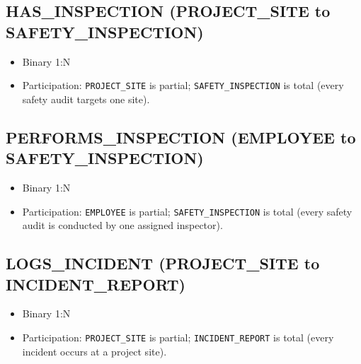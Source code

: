\documentclass[a4paper,12pt]{report}
\providecommand{\tightlist}{%
  \setlength{\itemsep}{0pt}\setlength{\parskip}{0pt}}
\begin{document}
\subsection{\texorpdfstring{HAS\texorpdfstring{\_\allowbreak{}}{_}INSPECTION (PROJECT\texorpdfstring{\_\allowbreak{}}{_}SITE to SAFETY\texorpdfstring{\_\allowbreak{}}{_}INSPECTION)}{HASINSPECTION (PROJECTSITE to SAFETYINSPECTION)}}\label{has_inspection-project_site-to-safety_inspection}

\begin{itemize}
\tightlist
\item
  Binary 1:N
\item
  Participation: \texttt{PROJECT\_\allowbreak{}SITE} is partial; \texttt{SAFETY\_\allowbreak{}INSPECTION} is total (\allowbreak{}every safety audit targets one site).
\end{itemize}

\subsection{\texorpdfstring{PERFORMS\texorpdfstring{\_\allowbreak{}}{_}INSPECTION (EMPLOYEE to SAFETY\texorpdfstring{\_\allowbreak{}}{_}INSPECTION)}{PERFORMSINSPECTION (EMPLOYEE to SAFETYINSPECTION)}}\label{performs_inspection-employee-to-safety_inspection}

\begin{itemize}
\tightlist
\item
  Binary 1:N
\item
  Participation: \texttt{EMPLOYEE} is partial; \texttt{SAFETY\_\allowbreak{}INSPECTION} is total (\allowbreak{}every safety audit is conducted by one assigned inspector).
\end{itemize}

\subsection{\texorpdfstring{LOGS\texorpdfstring{\_\allowbreak{}}{_}INCIDENT (PROJECT\texorpdfstring{\_\allowbreak{}}{_}SITE to INCIDENT\texorpdfstring{\_\allowbreak{}}{_}REPORT)}{LOGSINCIDENT (PROJECTSITE to INCIDENTREPORT)}}\label{logs_incident-project_site-to-incident_report}

\begin{itemize}
\tightlist
\item
  Binary 1:N
\item
  Participation: \texttt{PROJECT\_\allowbreak{}SITE} is partial; \texttt{INCIDENT\_\allowbreak{}REPORT} is total (\allowbreak{}every incident occurs at a project site).
\end{itemize}
\end{document}
